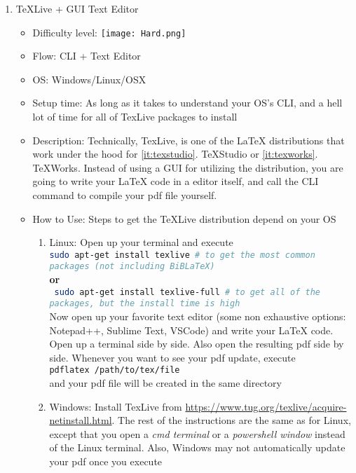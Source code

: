 \documentclass[12pt, letterpaper]{article}
\theoremstyle{remark}
\begin{document}
\begin{enumerate}
        \item TeXLive + GUI Text Editor \label{it:texlive}
        \begin{itemize}
            \item Difficulty level:  \texttt{[image: Hard.png]}
            \item Flow: CLI + Text Editor
            \item OS: Windows/Linux/OSX
            \item Setup time: As long as it takes to understand your OS's CLI, and a hell lot of time for all of TexLive packages to install
            \item Description: Technically, TexLive, is one of the \LaTeX{} distributions that work under the hood for \ref{it:texstudio}. TeXStudio or \ref{it:texworks}. TeXWorks. Instead of using a GUI for utilizing the distribution, you are going to write your \LaTeX{} code in a editor itself, and call the CLI command to compile your pdf file yourself.
            \item How to Use: Steps to get the TeXLive distribution depend on your OS
                \begin{enumerate}
                    \item Linux: Open up your terminal and execute \\ \lstinline[language=bash]{sudo apt-get install texlive # to get the most common packages (not including BiBLaTeX)} \\ \textbf{or} \\ \lstinline[language=bash]{ sudo apt-get install texlive-full # to get all of the packages, but the install time is high} \\
                    Now open up your favorite text editor (some non exhaustive options: Notepad++, Sublime Text, VSCode) and write your \LaTeX{} code. Open up a terminal side by side. Also open the resulting pdf side by side. Whenever you want to see your pdf update, execute \\ \lstinline[language=bash]{pdflatex /path/to/tex/file} \\ and your pdf file will be created in the same directory
                    \item Windows: Install TexLive from \url{https://www.tug.org/texlive/acquire-netinstall.html}. The rest of the instructions are the same as for Linux, except that you open a \textit{cmd terminal} or a \textit{powershell window} instead of the Linux terminal. Also, Windows may not automatically update your pdf once you execute

\end{enumerate}
\end{itemize}
\end{enumerate}
\end{document}
